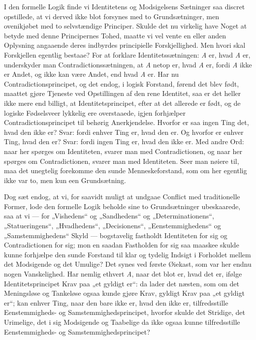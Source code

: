\documentclass[12pt,a4paper]{book}
\begin{document}
I den formelle Logik finde vi Identitetens og Modsigelsens Sætninger
saa discret opstillede, at vi derved ikke blot forsynes med to
Grundsætninger, men ovenikjøbet med to selvstændige Principer. Skulde
det nu virkelig have Noget at betyde med denne Principernes Tohed,
maatte vi vel vente en eller anden Oplysning angaaende deres indbyrdes
principielle Forskjellighed. Men hvori skal Forskjellen egentlig
bestaae? For at forklare Identitetssætningen: \textit{A} er, hvad
\textit{A} er, underskyder man Contradictionssætningen, at \textit{A}
netop er,
hvad \textit{A} er, fordi \textit{A} ikke er Andet, og ikke kan være
Andet, end hvad \textit{A} er. Har nu Contradictionsprincipet, og det
endog, i logisk Forstand, førend det blev født, maattet gjøre Tjeneste
ved Opstillingen af den rene Identitet, saa er det heller ikke mere
end billigt, at Identitetsprincipet, efter at det allerede er født, og
de logiske Fødselsveer lykkelig ere overstaaede, igjen forhjælper
Contradictionsprincipet til behørig Anerkjendelse. Hvorfor er saa
ingen Ting det, hvad den ikke er? Svar: fordi enhver Ting er, hvad
den er. Og hvorfor er enhver Ting, hvad den er? Svar: fordi ingen
Ting er, hvad den ikke er. Med andre Ord: naar her spørges om
Identiteten, svarer man med Contradictionen, og naar her spørges om
Contradictionen, svarer man med Identiteten. Seer man nøiere til, maa
det unegtelig forekomme den sunde Menneskeforstand, som om her
egentlig ikke var to, men kun een Grundsætning.

Dog sæt endog, at vi, for saavidt muligt at undgaae Conflict med
traditionelle Former, lode den formelle Logik beholde sine to
Grundsætninger ubeskaarede, saa at vi --- for „Vishedens“ og
„Sandhedens“ og „Determinationens“, „Statueringens“, „Hvadhedens“,
„Decisionens“, „Eenstemmighedens“ og „Samstemmighedens“ Skyld ---
bogstavelig fastholdt Identiteten for sig og Contradictionen for sig;
mon en saadan Fastholden for sig saa maaskee skulde kunne forhjælpe
den sunde Forstand til klar og tydelig Indsigt i Forholdet mellem det
Modsigende og det Umulige? Det synes ved første Øiekast, som var her
endnu nogen Vanskelighed. Har nemlig ethvert \textit{A}, naar det
blot er, hvad det er, ifølge Identitetsprincipet Krav paa „et gyldigt
er“: da lader det næsten, som om det Meningsløse og Tankeløse ogsaa
kunde gjøre Krav, gyldigt Krav paa „et gyldigt er“; kan enhver Ting,
naar den bare ikke er, hvad den ikke er, tilfredsstille
Eenstemmigheds- og Samstemmighedsprincipet, hvorfor skulde det
Stridige, det Urimelige, det i sig Modsigende og Taabelige
da ikke ogsaa kunne tilfredsstille Eenstemmigheds- og
Samstemmighedsprincipet?
\end{document}
